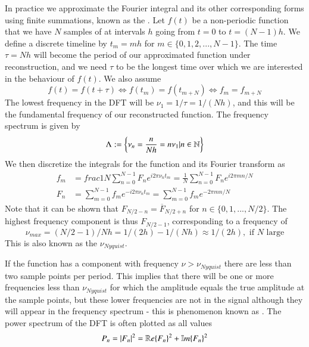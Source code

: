 \documentclass[12pt]{report}
\begin{document}
\begin{defn}{}{}
        In practice we approximate the Fourier integral and its other corresponding forms using finite summations, known as the . Let $f(t)$ be a non-periodic function that we have $N$ samples of at intervals $h$ going from $t = 0$ to $t = (N-1)h$. We define a discrete timeline by $t_m = mh$ for $m \in \{0,1,2,...,N-1\}$. The time $\tau = Nh$ will become the period of our approximated function under reconstruction, and we need $\tau$ to be the longest time over which we are interested in the behaviour of $f(t)$. We also assume \begin{equation}
                f(t) = f(t+\tau) \iff f(t_m) = f(t_{m+N}) \iff f_m = f_{m+N}
        \end{equation}
        The lowest frequency in the DFT will be $\nu_1 = 1/\tau = 1/(Nh)$, and this will be the fundamental frequency of our reconstructed function. The frequency spectrum is given by \begin{equation}
                \Lambda := \left\{\nu_n = \frac{n}{Nh} = n\nu_1\vert n \in \mathbb N\right\}
        \end{equation}
        We then discretize the integrals for the function and its Fourier transform as \begin{align}
                f_m &= frac{1}{N}\sum_{n=0}^{N-1}F_ne^{i2\pi\nu_nt_m} = \frac{1}{N}\sum_{n=0}^{N-1}F_ne^{i2\pi mn/N} \\
                F_n &= \sum_{m=0}^{N-1}f_me^{-i2\pi\nu_nt_m} = \sum_{m=0}^{N-1}f_me^{-2\pi mn/N}
        \end{align}
        Note that it can be shown that $F_{N/2-n} = \overline{F}_{N/2+n}$ for $n \in \{0,1,...,N/2\}$. The highest frequency component is thus $F_{N/2-1}$, corresponding to a frequency of \begin{equation}
                \nu_{max} = (N/2-1)/Nh = 1/(2h) - 1/(Nh) \approx 1/(2h), \text{ if $N$ large}
        \end{equation}
        This is also known as the  $\nu_{Nyquist}$.


        If the function has a component with frequency $\nu > \nu_{Nyquist}$ there are less than two sample points per period. This implies that there will be one or more frequencies less than $\nu_{Nyquist}$ for which the amplitude equals the true amplitude at the sample points, but these lower frequencies are not in the signal although they will appear in the frequency spectrum - this is phenomenon known as . The power spectrum of the DFT is often plotted as all values \begin{equation}
                P_n = |F_n|^2 = \mathbb R e\{F_n\}^2+\mathbb{I}m\{F_n\}^2
        \end{equation}
\end{defn}
\end{document}
